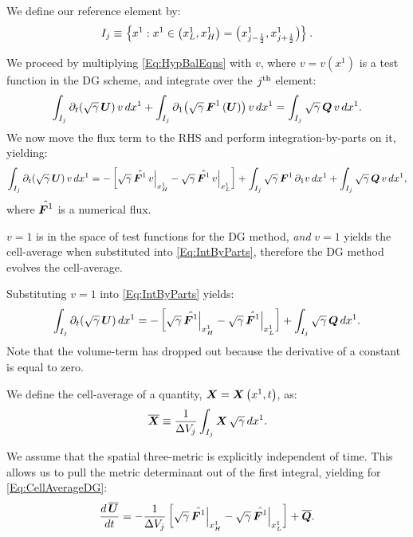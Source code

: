 We define our reference element by:
\begin{equation}
    I_{j}\equiv\left\{x^{1}:x^{1}\in\left(x^{1}_{L},x^{1}_{H}\right)=\left(x^{1}_{\jmh},x^{1}_{\jph}\right)\right\}.
\end{equation}

We proceed by multiplying \eqref{Eq:HypBalEqns} with $v$, where $v=v\left(x^{1}\right)$ is a test function in the DG scheme, and integrate over the $\jth$ element:
\begin{equation}
    \int_{I_{j}}\pd{\left(\sqrtgm\,\bU\right)}{t}\,v\,dx^{1}+\int_{I_{j}}\pd{\left(\sqrtgm\,\bF^{1}\left(\bU\right)\right)}{1}\,v\,dx^{1}=\int_{I_{j}}\sqrtgm\,\bQ\,v\,dx^{1}.
\end{equation}
We now move the flux term to the RHS and perform integration-by-parts on it, yielding:
\begin{equation}\label{Eq:IntByParts}
    \int_{I_{j}}\pd{\left(\sqrtgm\,\bU\right)}{t}\,v\,dx^{1}=-\left[\sqrtgm\,\hat{\bF^{1}}\,v\Big|_{x^{1}_{H}}-\sqrtgm\,\hat{\bF^{1}}\,v\Big|_{x^{1}_{L}}\right]+\int_{I_{j}}\sqrtgm\,\bF^{1}\,\pd{v}{1}\,dx^{1}+\int_{I_{j}}\sqrtgm\,\bQ\,v\,dx^{1},
\end{equation}
where $\hat{\bF^{1}}$ is a numerical flux.

 $v=1$ is in the space of test functions for the DG method, \textit{and} $v=1$ yields the cell-average when substituted into \eqref{Eq:IntByParts}, therefore the DG method evolves the cell-average.

Substituting $v=1$ into \eqref{Eq:IntByParts} yields:
\begin{equation}\label{Eq:CellAverageDG}
    \int_{I_{j}}\pd{\left(\sqrtgm\,\bU\right)}{t}\,dx^{1}=-\left[\sqrtgm\,\hat{\bF^{1}}\Big|_{x^{1}_{H}}-\sqrtgm\,\hat{\bF^{1}}\Big|_{x^{1}_{L}}\right]+\int_{I_{j}}\sqrtgm\,\bQ\,dx^{1}.
\end{equation}
Note that the volume-term has dropped out because the derivative of a constant is equal to zero.

We define the cell-average of a quantity, $\bX=\bX\left(x^{1},t\right)$, as:
\begin{equation}
    \ol{\bX}\equiv\f{1}{\Delta V_{j}}\int_{I_{j}}\bX\,\sqrtgm\,dx^{1}.
\end{equation}

 We assume that the spatial three-metric is explicitly independent of time. This allows us to pull the metric determinant out of the first integral, yielding for \eqref{Eq:CellAverageDG}:
\begin{equation}
    \f{d\,\ol{\bU}}{dt}=-\f{1}{\Delta V_{j}}\left[\sqrtgm\,\hat{\bF^{1}}\Big|_{x^{1}_{H}}-\sqrtgm\,\hat{\bF^{1}}\Big|_{x^{1}_{L}}\right]+\ol{\bQ}.
\end{equation}

